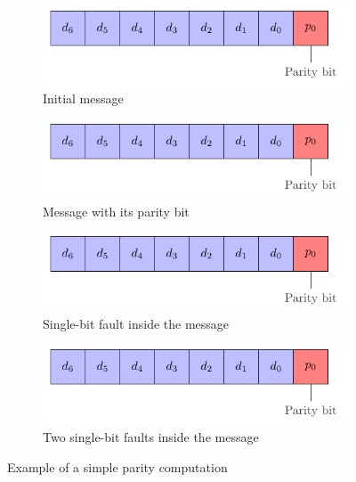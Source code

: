 \begin{figure}[ht]
    \centering
    \begin{subfigure}[b]{0.49\textwidth}
        \includegraphics[width=\textwidth, page=2]{c5_countermeasures_dift/img/simple_parity.pdf}
        \caption{Initial message}
        \label{fig:simpleparity_example_1}
    \end{subfigure}
    \hfill
    \begin{subfigure}[b]{0.49\textwidth}
        \includegraphics[width=\textwidth, page=3]{c5_countermeasures_dift/img/simple_parity.pdf}
        \caption{Message with its parity bit}
        \label{fig:simpleparity_example_2}
    \end{subfigure}
    \hfill
    \begin{subfigure}[b]{0.49\textwidth}
        \includegraphics[width=\textwidth, page=4]{c5_countermeasures_dift/img/simple_parity.pdf}
        \caption{Single-bit fault inside the message}
        \label{fig:simpleparity_faulted_example_3}
    \end{subfigure}
    \hfill
    \begin{subfigure}[b]{0.49\textwidth}
        \includegraphics[width=\textwidth, page=5]{c5_countermeasures_dift/img/simple_parity.pdf}
        \caption{Two single-bit faults inside the message}
        \label{fig:simpleparity_faulted_example_4}
    \end{subfigure}
    \caption{Example of a simple parity computation}
    \label{fig:simpleparity_example}
\end{figure}


